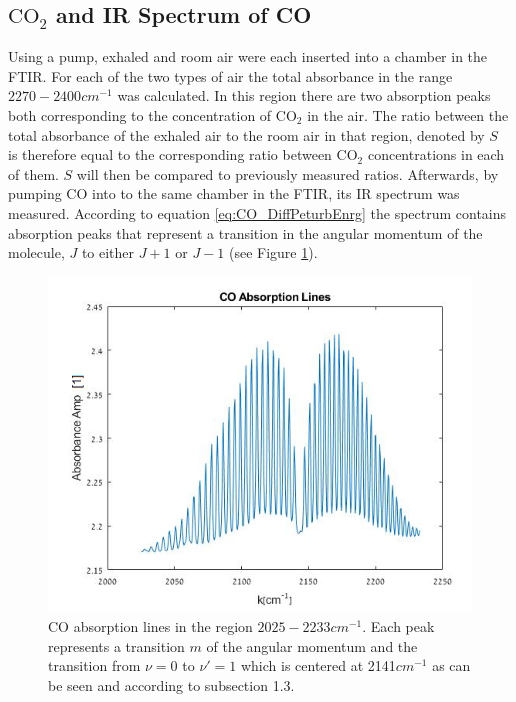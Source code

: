 \documentclass[reprint,amsmath,amssymb,aps, prl,superscriptaddress]{revtex4-2}
\begin{document}
\subsection{$\text{CO}_{2}$ and IR Spectrum of CO}
Using a pump, exhaled and room air were each inserted into a chamber in the FTIR. For each of the two types of air the total absorbance in the range $2270-2400cm^{-1}$ was
calculated. In this region there are two absorption peaks both corresponding to the concentration of $\text{CO}_{2}$ in the air. The ratio between the total absorbance of the exhaled air to the room air in that region, denoted by $S$ is therefore equal to the corresponding ratio between $\text{CO}_{2}$ concentrations in each of them. $S$ will then be compared to previously measured ratios. 
Afterwards, by pumping CO into to the same chamber in the FTIR, its IR spectrum was measured.
According to equation \ref{eq:CO_DiffPeturbEnrg}
the spectrum contains absorption peaks that represent a transition in the angular momentum of the molecule, $J$  to either $J+1$ or $J-1$ (see Figure \ref{fig:CoEnergy}).
\begin{figure}[H]
    \includegraphics[width=\linewidth]{Images/COEnergystatesUPDATED.png}
    \caption{CO absorption lines in the region $2025-2233 cm^{-1}$. Each peak represents a transition $m$ of the angular momentum and the transition from $\nu=0$ to $\nu'=1$ which is centered at 2141$cm^{-1}$  as can be seen and according to subsection 1.3.
    }
    \label{fig:CoEnergy}
    \centering
\end{figure}
\end{document}
